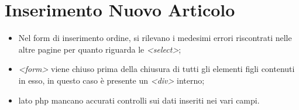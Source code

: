 \section{Inserimento Nuovo Articolo}
\begin{itemize}
	\item Nel form di inserimento ordine, si rilevano i medesimi errori riscontrati nelle altre pagine per quanto riguarda le \textit{<select>};
	
	\item \textit{<form>} viene chiuso prima della chiusura di tutti gli elementi figli contenuti in esso, in questo caso è presente un \textit{<div>} interno;   
	
	\item lato php mancano accurati controlli sui dati inseriti nei vari campi.
\end{itemize}
